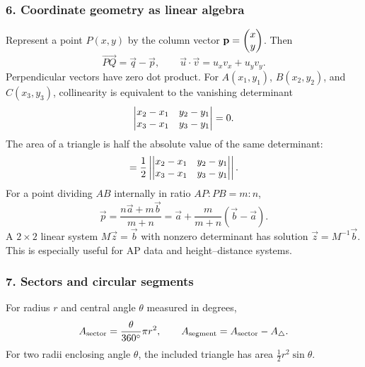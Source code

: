 \subsubsection*{6. Coordinate geometry as linear algebra}
Represent a point $P(x,y)$ by the column vector $\mathbf p=\begin{pmatrix}x\\y\end{pmatrix}$. Then
\begin{equation}
\overrightarrow{PQ}=\vec q-\vec p,\qquad
\vec u\cdot\vec v=u_xv_x+u_yv_y.
\label{eq:vector-basics}
\end{equation}
Perpendicular vectors have zero dot product. For $A(x_1,y_1)$, $B(x_2,y_2)$, and $C(x_3,y_3)$, collinearity is equivalent to the vanishing determinant
\begin{equation}
\begin{vmatrix}x_2-x_1&y_2-y_1\\x_3-x_1&y_3-y_1\end{vmatrix}=0.
\label{eq:collinear-det}
\end{equation}
The area of a triangle is half the absolute value of the same determinant:
\begin{equation}
[ABC]=\frac12\left|\mydet{x_2-x_1&y_2-y_1\\x_3-x_1&y_3-y_1}\right|.
\label{eq:triangle-det}
\end{equation}
For a point dividing $AB$ internally in ratio $AP:PB=m:n$,
\begin{equation}
\vec p=\frac{n\vec a+m\vec b}{m+n}=\vec a+\frac{m}{m+n}(\vec b-\vec a).
\label{eq:section-vector}
\end{equation}
A $2\times2$ linear system $M\vec z=\vec b$ with nonzero determinant has solution $\vec z=M^{-1}\vec b$. This is especially useful for AP data and height--distance systems.

\subsubsection*{7. Sectors and circular segments}
For radius $r$ and central angle $\theta$ measured in degrees,
\begin{equation}
A_{\rm sector}=\frac{\theta}{360^\circ}\pi r^2,\qquad
A_{\rm segment}=A_{\rm sector}-A_{\triangle}.
\label{eq:sector-segment}
\end{equation}
For two radii enclosing angle $\theta$, the included triangle has area $\frac12r^2\sin\theta$.

